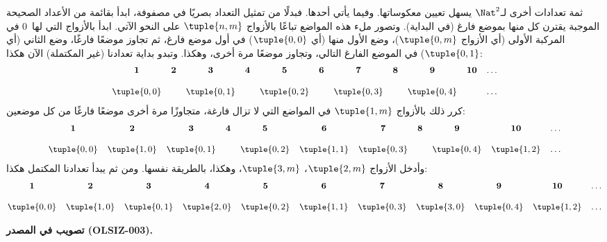 \documentclass[../../../include/open-logic-section]{subfiles}
\begin{document}


\begin{explain}
ثمة تعدادات أخرى لـ$\Nat^2$ يسهل تعيين معكوساتها. وفيما يأتي
أحدها. فبدلًا من تمثيل التعداد بصريًا في مصفوفة، ابدأ بقائمة من
الأعداد الصحيحة الموجبة يقترن كل منها بموضع فارغ (في البداية). وتصور
ملء هذه المواضع تباعًا بالأزواج $\tuple{n,m}$ على النحو الآتي.
ابدأ بالأزواج التي لها~$0$ في المركبة الأولى (أي الأزواج
$\tuple{0,m}$)، وضع الأول منها (أي $\tuple{0,0}$) في أول موضع فارغ،
ثم تجاوز موضعًا فارغًا، وضع الثاني (أي $\tuple{0,1}$) في الموضع
الفارغ التالي، وتجاوز موضعًا مرة أخرى، وهكذا. وتبدو بداية تعدادنا
(غير المكتملة) الآن هكذا:
\[\small
\begin{array}{@{}c c c c c c c c c c c@{}}
\mathbf 1 & \mathbf 2 & \mathbf 3 & \mathbf 4 & \mathbf 5 & \mathbf 6 & \mathbf 7 & \mathbf 8 & \mathbf 9 & \mathbf{10} & \dots \\ \\
\tuple{0,0} &  & \tuple{0,1} &  & \tuple{0,2} &  & \tuple{0,3} & & \tuple{0,4} &  & \dots \\
\end{array}
\]
كرر ذلك بالأزواج $\tuple{1,m}$ في المواضع التي لا تزال فارغة،
متجاوزًا مرة أخرى موضعًا فارغًا من كل موضعين:
\[\small
\begin{array}{@{}c c c c c c c c c c c@{}}
\mathbf 1 & \mathbf 2 & \mathbf 3 & \mathbf 4 & \mathbf 5 & \mathbf 6 & \mathbf 7 & \mathbf 8 & \mathbf 9 & \mathbf{10} & \dots \\ \\
\tuple{0,0} & \tuple{1,0} & \tuple{0,1} &  & \tuple{0,2} & \tuple{1,1} &
\tuple{0,3} & & \tuple{0,4} &  \tuple{1,2} & \dots \\
\end{array}
\]
وأدخل الأزواج $\tuple{2,m}$، $\tuple{3,m}$، وهكذا، بالطريقة نفسها.
ومن ثم يبدأ تعدادنا المكتمل هكذا:
\[\small
\begin{array}{@{}cc c c c c c c c c c@{}}
\mathbf 1 & \mathbf 2 & \mathbf 3 & \mathbf 4 & \mathbf 5 & \mathbf 6 & \mathbf 7 & \mathbf 8 & \mathbf 9 & \mathbf{10} & \dots \\ \\
\tuple{0,0} & \tuple{1,0} & \tuple{0,1} & \tuple{2,0}  & \tuple{0,2} &
\tuple{1,1} & \tuple{0,3} & \tuple{3,0}  & \tuple{0,4} &  \tuple{1,2} & \dots \\
\end{array}
\]
\begin{editorial}
\textbf{تصويب في المصدر (OLSIZ-003).}

\end{editorial}
\end{explain}
\end{document}
